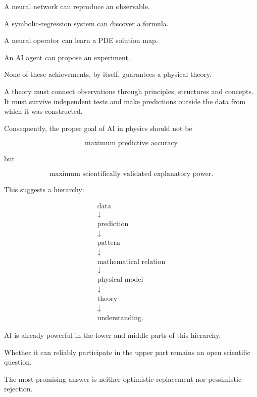 \documentclass[11pt,a4paper,oneside]{book}
\begin{document}
A neural network can reproduce an observable.

A symbolic-regression system can discover a formula.

A neural operator can learn a PDE solution map.

An AI agent can propose an experiment.

None of these achievements, by itself, guarantees a physical theory.

A theory must connect observations through principles, structures and
concepts. It must survive independent tests and make predictions outside the
data from which it was constructed.

Consequently, the proper goal of AI in physics should not be

\begin{equation}
\text{maximum predictive accuracy}
\end{equation}

but

\begin{equation}
\boxed{
\text{maximum scientifically validated explanatory power}.
}
\end{equation}

This suggests a hierarchy:

\begin{equation}
\begin{array}{c}
\text{data}\\
\downarrow\\
\text{prediction}\\
\downarrow\\
\text{pattern}\\
\downarrow\\
\text{mathematical relation}\\
\downarrow\\
\text{physical model}\\
\downarrow\\
\text{theory}\\
\downarrow\\
\text{understanding}.
\end{array}
\end{equation}

AI is already powerful in the lower and middle parts of this hierarchy.

Whether it can reliably participate in the upper part remains an open scientific
question.

The most promising answer is neither optimistic replacement nor pessimistic
rejection.
\end{document}
